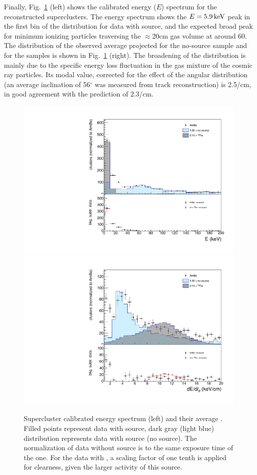 Finally, Fig.~\ref{fig:energy} (left) shows the calibrated energy
($E$) spectrum for the reconstructed superclusters. The energy
spectrum shows the $E=5.9\,\textrm{ke\hspace{-.08em}V}$ peak in the first bin of the
distribution for data with \fe source, and the expected broad peak for
minimum ionizing particles traversing the $\approx$20\unit{cm} gas
volume at around 60\keV. The distribution of the observed average
projected \dedl for the no-source sample and for the \ambe samples is
shown in Fig.~\ref{fig:energy} (right). The broadening of the
distribution is mainly due to the specific energy loss fluctuation in
the gas mixture of the cosmic ray particles.  Its modal value,
corrected for the effect of the angular distribution (an average
inclination of 56$^{\circ}$ was measured from track reconstruction) is
2.5\keV/cm, in good agreement with the \garfield prediction of
2.3\keV/cm.

\begin{figure}[ht]
  \begin{center}
  \includegraphics[width=0.45\linewidth]{figures/energyExt}
  \includegraphics[width=0.45\linewidth]{figures/dedx}

  \caption{Supercluster calibrated energy spectrum (left) and their
    average \dedl. Filled points represent data with \ambe source,
    dark gray (light blue) distribution represents data with \fe
    source (no source).  The normalization of data without source is
    to the same exposure time of the \ambe one. For the data with \fe,
    a scaling factor of one tenth is applied for clearness, given the
    larger activity of this source. \label{fig:energy}}

\end{center}
\end{figure}

